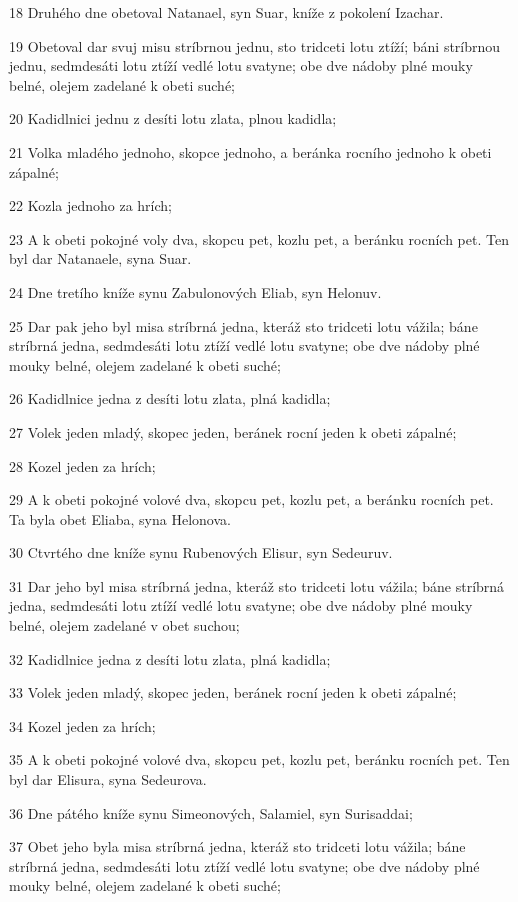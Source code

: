 \par 18 Druhého dne obetoval Natanael, syn Suar, kníže z pokolení Izachar.
\par 19 Obetoval dar svuj misu stríbrnou jednu, sto tridceti lotu ztíží; báni stríbrnou jednu, sedmdesáti lotu ztíží vedlé lotu svatyne; obe dve nádoby plné mouky belné, olejem zadelané k obeti suché;
\par 20 Kadidlnici jednu z desíti lotu zlata, plnou kadidla;
\par 21 Volka mladého jednoho, skopce jednoho, a beránka rocního jednoho k obeti zápalné;
\par 22 Kozla jednoho za hrích;
\par 23 A k obeti pokojné voly dva, skopcu pet, kozlu pet, a beránku rocních pet. Ten byl dar Natanaele, syna Suar.
\par 24 Dne tretího kníže synu Zabulonových Eliab, syn Helonuv.
\par 25 Dar pak jeho byl misa stríbrná jedna, kteráž sto tridceti lotu vážila; báne stríbrná jedna, sedmdesáti lotu ztíží vedlé lotu svatyne; obe dve nádoby plné mouky belné, olejem zadelané k obeti suché;
\par 26 Kadidlnice jedna z desíti lotu zlata, plná kadidla;
\par 27 Volek jeden mladý, skopec jeden, beránek rocní jeden k obeti zápalné;
\par 28 Kozel jeden za hrích;
\par 29 A k obeti pokojné volové dva, skopcu pet, kozlu pet, a beránku rocních pet. Ta byla obet Eliaba, syna Helonova.
\par 30 Ctvrtého dne kníže synu Rubenových Elisur, syn Sedeuruv.
\par 31 Dar jeho byl misa stríbrná jedna, kteráž sto tridceti lotu vážila; báne stríbrná jedna, sedmdesáti lotu ztíží vedlé lotu svatyne; obe dve nádoby plné mouky belné, olejem zadelané v obet suchou;
\par 32 Kadidlnice jedna z desíti lotu zlata, plná kadidla;
\par 33 Volek jeden mladý, skopec jeden, beránek rocní jeden k obeti zápalné;
\par 34 Kozel jeden za hrích;
\par 35 A k obeti pokojné volové dva, skopcu pet, kozlu pet, beránku rocních pet. Ten byl dar Elisura, syna Sedeurova.
\par 36 Dne pátého kníže synu Simeonových, Salamiel, syn Surisaddai;
\par 37 Obet jeho byla misa stríbrná jedna, kteráž sto tridceti lotu vážila; báne stríbrná jedna, sedmdesáti lotu ztíží vedlé lotu svatyne; obe dve nádoby plné mouky belné, olejem zadelané k obeti suché;
